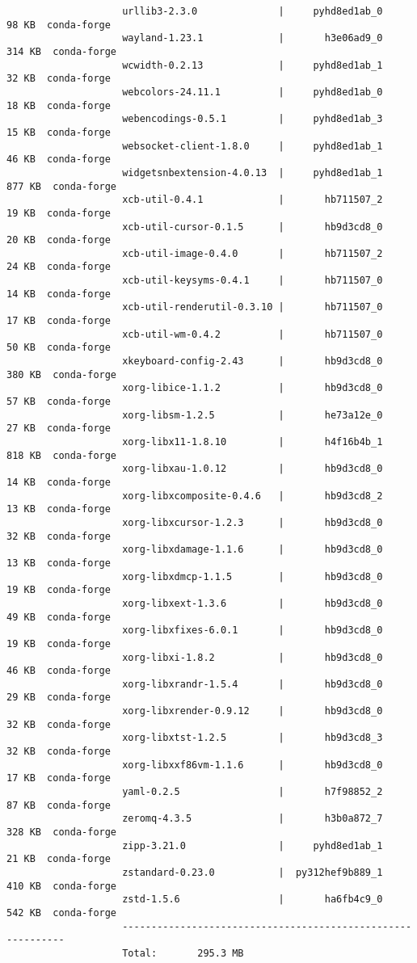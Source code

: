 \documentclass{article}
\begin{document}
\begin{enumerate}
\begin{itemize}
\begin{itemize}
\begin{itemize}
\begin{verbatim}
					urllib3-2.3.0              |     pyhd8ed1ab_0          98 KB  conda-forge
					wayland-1.23.1             |       h3e06ad9_0         314 KB  conda-forge
					wcwidth-0.2.13             |     pyhd8ed1ab_1          32 KB  conda-forge
					webcolors-24.11.1          |     pyhd8ed1ab_0          18 KB  conda-forge
					webencodings-0.5.1         |     pyhd8ed1ab_3          15 KB  conda-forge
					websocket-client-1.8.0     |     pyhd8ed1ab_1          46 KB  conda-forge
					widgetsnbextension-4.0.13  |     pyhd8ed1ab_1         877 KB  conda-forge
					xcb-util-0.4.1             |       hb711507_2          19 KB  conda-forge
					xcb-util-cursor-0.1.5      |       hb9d3cd8_0          20 KB  conda-forge
					xcb-util-image-0.4.0       |       hb711507_2          24 KB  conda-forge
					xcb-util-keysyms-0.4.1     |       hb711507_0          14 KB  conda-forge
					xcb-util-renderutil-0.3.10 |       hb711507_0          17 KB  conda-forge
					xcb-util-wm-0.4.2          |       hb711507_0          50 KB  conda-forge
					xkeyboard-config-2.43      |       hb9d3cd8_0         380 KB  conda-forge
					xorg-libice-1.1.2          |       hb9d3cd8_0          57 KB  conda-forge
					xorg-libsm-1.2.5           |       he73a12e_0          27 KB  conda-forge
					xorg-libx11-1.8.10         |       h4f16b4b_1         818 KB  conda-forge
					xorg-libxau-1.0.12         |       hb9d3cd8_0          14 KB  conda-forge
					xorg-libxcomposite-0.4.6   |       hb9d3cd8_2          13 KB  conda-forge
					xorg-libxcursor-1.2.3      |       hb9d3cd8_0          32 KB  conda-forge
					xorg-libxdamage-1.1.6      |       hb9d3cd8_0          13 KB  conda-forge
					xorg-libxdmcp-1.1.5        |       hb9d3cd8_0          19 KB  conda-forge
					xorg-libxext-1.3.6         |       hb9d3cd8_0          49 KB  conda-forge
					xorg-libxfixes-6.0.1       |       hb9d3cd8_0          19 KB  conda-forge
					xorg-libxi-1.8.2           |       hb9d3cd8_0          46 KB  conda-forge
					xorg-libxrandr-1.5.4       |       hb9d3cd8_0          29 KB  conda-forge
					xorg-libxrender-0.9.12     |       hb9d3cd8_0          32 KB  conda-forge
					xorg-libxtst-1.2.5         |       hb9d3cd8_3          32 KB  conda-forge
					xorg-libxxf86vm-1.1.6      |       hb9d3cd8_0          17 KB  conda-forge
					yaml-0.2.5                 |       h7f98852_2          87 KB  conda-forge
					zeromq-4.3.5               |       h3b0a872_7         328 KB  conda-forge
					zipp-3.21.0                |     pyhd8ed1ab_1          21 KB  conda-forge
					zstandard-0.23.0           |  py312hef9b889_1         410 KB  conda-forge
					zstd-1.5.6                 |       ha6fb4c9_0         542 KB  conda-forge
					------------------------------------------------------------
					Total:       295.3 MB
					

\end{verbatim}
\end{itemize}
\end{itemize}
\end{itemize}
\end{enumerate}
\end{document}
